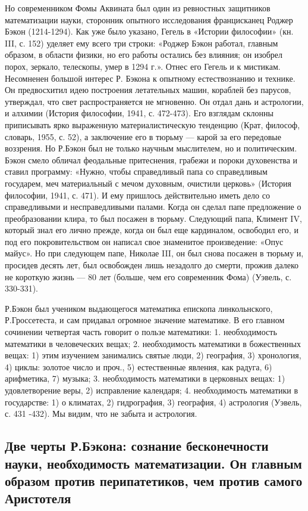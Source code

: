 Но современником Фомы Аквината был один из ревностных защитников
математизации науки, сторонник опытного исследования францисканец
Роджер Бэкон (1214-1294). Как уже было указано, Гегель в «Истории
философии» (кн. III, с. 152) уделяет ему всего три строки: «Роджер
Бэкон работал, главным образом, в области физики, но его работы
остались без влияния; он изобрел порох, зеркало, телескопы, умер в
1294 г.». Отнес его Гегель и к мистикам. Несомненен большой интерес Р.
Бэкона к опытному естествознанию и технике. Он предвосхитил идею
построения летательных машин, кораблей без парусов, утверждал, что
свет распространяется не мгновенно. Он отдал дань и астрологии, и
алхимии (История философии, 1941, с. 472-473). Его взглядам склонны
приписывать ярко выраженную материалистическую тенденцию (Крат,
философ, словарь, 1955, с. 52), а заключение его в тюрьму --- карой за
его передовые воззрения. Но Р.Бэкон был не только научным мыслителем,
но и политическим. Бэкон смело обличал феодальные притеснения, грабежи
и пороки духовенства и ставил программу: «Нужно, чтобы справедливый
папа со справедливым государем, меч материальный с мечом духовным,
очистили церковь» (История философии, 1941, с. 471). И ему пришлось
действительно иметь дело со справедливыми и несправедливыми палами.
Когда он сделал папе предложение о преобразовании клира, то был
посажен в тюрьму. Следующий папа, Климент IV, который знал его лично
прежде, когда он был еще кардиналом, освободил его, и под его
покровительством он написал свое знаменитое произведение: «Опус
майус». Но при следующем папе, Николае III, он был снова посажен в
тюрьму и, просидев десять лет, был освобожден лишь незадолго до
смерти, прожив далеко не короткую жизнь --- 80 лет (больше, чем его
современник Фома) (Уэвель, с. 330-331).

Р.Бэкон был учеником выдающегося математика епископа линкольнского,
Р.Гроссетеста, и сам придавал огромное значение математике. В его
главном сочинении четвертая часть говорит о пользе математики: 1.
необходимость математики в человеческих вещах; 2. необходимость
математики в божественных вещах: 1) этим изучением занимались святые
люди, 2) география, 3) хронология, 4) циклы: золотое число и проч., 5)
естественные явления, как радуга, 6) арифметика, 7) музыка; 3.
необходимость математики в церковных вещах: 1) удовлетворение веры, 2)
исправление календаря; 4. необходимость математики в государстве: 1) о
климатах, 2) гидрография, 3) география, 4) астрология (Уэвель, с. 431
-432). Мы видим, что не забыта и астрология.

\subsection{Две черты Р.Бэкона: сознание бесконечности науки,
необходимость математизации. Он главным образом против
перипатетиков, чем против самого Аристотеля}

